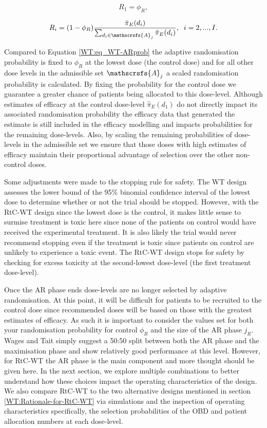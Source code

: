 \begin{equation}
R_1 = \phi_R,
\end{equation}

\begin{equation}
R_i = (1-\phi_R)\frac{\hat{\pi}_E(d_i)}{\sum_{d_i \in \mathscrsfs{A}_j}\hat{\pi}_E(d_i)}, \; \; i=2,...,I. 
\end{equation}

Compared to Equation \ref{WT:eq_WT-ARprob} the adaptive randomisation probability is fixed to $\phi_R$ at the lowest dose (the control dose) and for all other dose levels in the admissible set $\mathscrsfs{A}_j$ a scaled randomisation probability is calculated. By fixing the probability for the control dose we guarantee a greater chance of patients being allocated to this dose-level. Although estimates of efficacy at the control dose-level $\hat{\pi}_E(d_1)$ do not directly impact its associated randomisation probability the efficacy data that generated the estimate is still included in the efficacy modelling and impacts probabilities for the remaining dose-levels. Also, by scaling the remaining probabilities of dose-levels in the admissible set we ensure that those doses with high estimates of efficacy maintain their proportional advantage of selection over the other non-control doses.

Some adjustments were made to the stopping rule for safety. The WT design assesses the lower bound of the 95\% binomial confidence interval of the lowest dose to determine whether or not the trial should be stopped. However, with the RtC-WT design since the lowest dose is the control, it makes little sense to surmise treatment is toxic here since none of the patients on control would have received the experimental treatment. It is also likely the trial would never recommend stopping even if the treatment is toxic since patients on control are unlikely to experience a toxic event. The RtC-WT design stops for safety by checking for excess toxicity at the second-lowest dose-level (the first treatment dose-level). 

Once the AR phase ends dose-levels are no longer selected by adaptive randomisation. At this point, it will be difficult for patients to be recruited to the control dose since recommended doses will be based on those with the greatest estimates of efficacy. As such it is important to consider the values set for both your randomisation probability for control $\phi_R$ and the size of the AR phase $j_R$. Wages and Tait simply suggest a 50:50 split between both the AR phase and the maximisation phase and show relatively good performance at this level. However, for RtC-WT the AR phase is the main component and more thought should be given here. In the next section, we explore multiple combinations to better understand how these choices impact the operating characteristics of the design. We also compare RtC-WT to the two alternative designs mentioned in section  \ref{WT:Rationale-for-RtC-WT} via simulations and the inspection of operating characteristics specifically, the selection probabilities of the OBD and patient allocation numbers at each dose-level. 
 
